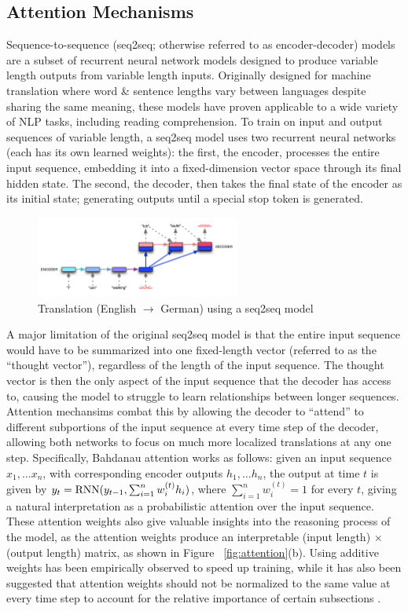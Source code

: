 \documentclass{article}
\begin{document}
\subsection{Attention Mechanisms}
Sequence-to-sequence (seq2seq; otherwise referred to as encoder-decoder) models are a subset of recurrent neural network models designed to produce variable length outputs from variable length inputs. Originally designed for machine translation \cite{seq2seq} where word \& sentence lengths vary between languages despite sharing the same meaning, these models have proven applicable to a wide variety of NLP tasks, including reading comprehension. To train on input and output sequences of variable length, a seq2seq model uses two recurrent neural networks (each has its own learned weights): the first, the encoder, processes the entire input sequence, embedding it into a fixed-dimension vector space through its final hidden state. The second, the decoder, then takes the final state of the encoder as its initial state; generating outputs until a special stop token is generated. 

\begin{figure}[h]
	\includegraphics[width=0.6\textwidth]{seq2seq.png}
	\centering
	\caption{Translation (English $\rightarrow$ German) using a seq2seq model}
	\label{fig:seq2seq}
\end{figure}

A major limitation of the original seq2seq model is that the entire input sequence would have to be summarized into one fixed-length vector (referred to as the ``thought vector''), regardless of the length of the input sequence. The thought vector is then the only aspect of the input sequence that the decoder has access to, causing the model to struggle to learn relationships between longer sequences. Attention mechansims combat this by allowing the decoder to ``attend'' to different subportions of the input sequence at every time step of the decoder, allowing both networks to focus on much more localized translations at any one step. Specifically, Bahdanau attention \cite{Bahdanau} works as follows: given an input sequence $x_1, \ldots x_n$, with corresponding encoder outputs $h_1, \ldots h_n$, the output at time $t$ is given by $y_t = \textnormal{RNN}(y_{t-1}, \sum_{i=1}^n w_i^{(t)} h_i)$, where $\sum_{i=1}^n w_i^{(t)} = 1$ for every $t$, giving a natural interpretation as a probabilistic attention over the input sequence. These attention weights also give valuable insights into the reasoning process of the model, as the attention weights produce an interpretable (input length) $\times$ (output length) matrix, as shown in Figure ~\ref{fig:attention}(b). Using additive weights \cite{Luong} has been empirically observed to speed up training, while it has also been suggested that attention weights should not be normalized to the same value at every time step to account for the relative importance of certain subsections \cite{Nallapati}. 
\end{document}
